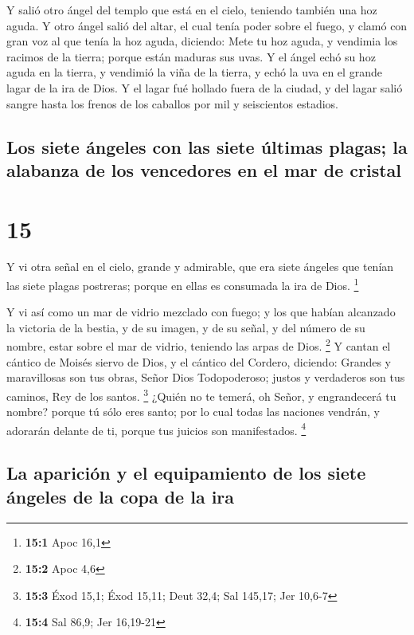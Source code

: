  Y salió otro ángel del templo que está en el cielo,
teniendo también una hoz aguda.  Y otro ángel salió del
altar, el cual tenía poder sobre el fuego, y clamó con gran voz al que
tenía la hoz aguda, diciendo: Mete tu hoz aguda, y vendimia los racimos
de la tierra; porque están maduras sus uvas.  Y el ángel
echó su hoz aguda en la tierra, y vendimió la viña de la tierra, y echó
la uva en el grande lagar de la ira de Dios.  Y el lagar
fué hollado fuera de la ciudad, y del lagar salió sangre hasta los
frenos de los caballos por mil y seiscientos estadios.

\hypertarget{los-siete-uxe1ngeles-con-las-siete-uxfaltimas-plagas-la-alabanza-de-los-vencedores-en-el-mar-de-cristal}{%
\subsection{Los siete ángeles con las siete últimas plagas; la alabanza
de los vencedores en el mar de
cristal}\label{los-siete-uxe1ngeles-con-las-siete-uxfaltimas-plagas-la-alabanza-de-los-vencedores-en-el-mar-de-cristal}}

\hypertarget{section-14}{%
\section{15}\label{section-14}}

 Y vi otra señal en el cielo, grande y admirable, que era
siete ángeles que tenían las siete plagas postreras; porque en ellas es
consumada la ira de Dios. \footnote{\textbf{15:1} Apoc 16,1}

 Y vi así como un mar de vidrio mezclado con fuego; y los
que habían alcanzado la victoria de la bestia, y de su imagen, y de su
señal, y del número de su nombre, estar sobre el mar de vidrio, teniendo
las arpas de Dios. \footnote{\textbf{15:2} Apoc 4,6}  Y
cantan el cántico de Moisés siervo de Dios, y el cántico del Cordero,
diciendo: Grandes y maravillosas son tus obras, Señor Dios Todopoderoso;
justos y verdaderos son tus caminos, Rey de los santos. \footnote{\textbf{15:3}
  Éxod 15,1; Éxod 15,11; Deut 32,4; Sal 145,17; Jer 10,6-7}
 ¿Quién no te temerá, oh Señor, y engrandecerá tu nombre?
porque tú sólo eres santo; por lo cual todas las naciones vendrán, y
adorarán delante de ti, porque tus juicios son manifestados. \footnote{\textbf{15:4}
  Sal 86,9; Jer 16,19-21}

\hypertarget{la-apariciuxf3n-y-el-equipamiento-de-los-siete-uxe1ngeles-de-la-copa-de-la-ira}{%
\subsection{La aparición y el equipamiento de los siete ángeles de la
copa de la
ira}\label{la-apariciuxf3n-y-el-equipamiento-de-los-siete-uxe1ngeles-de-la-copa-de-la-ira}}

